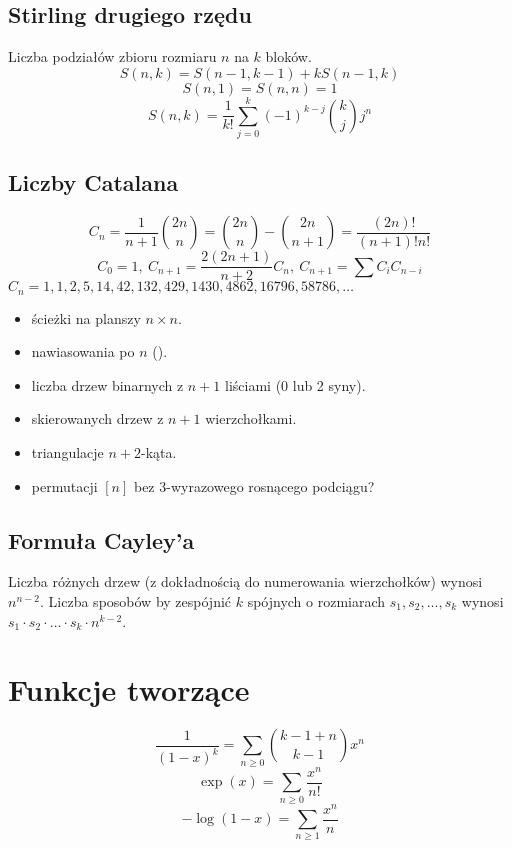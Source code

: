 	\subsection{Stirling drugiego rzędu}
		Liczba podziałów zbioru rozmiaru $n$ na $k$ bloków.
		$$S(n,k) = S(n-1,k-1) + k S(n-1,k)$$
		$$S(n,1) = S(n,n) = 1$$
		$$S(n,k) = \frac{1}{k!}\sum_{j=0}^k (-1)^{k-j}\binom{k}{j}j^n$$

	\subsection{Liczby Catalana}
		\[ C_n=\frac{1}{n+1}\binom{2n}{n}= \binom{2n}{n}-\binom{2n}{n+1} = \frac{(2n)!}{(n+1)!n!} \]
		\[ C_0=1,\ C_{n+1} = \frac{2(2n+1)}{n+2}C_n,\ C_{n+1}=\sum C_iC_{n-i} \]
		${C_n = 1, 1, 2, 5, 14, 42, 132, 429, 1430, 4862, 16796, 58786, \dots}$

		\begin{itemize}[noitemsep]
			\item ścieżki na planszy $n\times n$.
			\item nawiasowania po $n$ ().
			\item liczba drzew binarnych z $n+1$ liściami (0 lub 2 syny).
			\item skierowanych drzew z $n+1$ wierzchołkami.
			\item triangulacje $n+2$-kąta.
			\item permutacji $[n]$ bez 3-wyrazowego rosnącego podciągu?
		\end{itemize}

		\hfil

	\subsection{Formuła Cayley'a}
		Liczba różnych drzew (z dokładnością do numerowania wierzchołków) wynosi $n^{n-2}$.
		Liczba sposobów by zespójnić $k$ spójnych o rozmiarach $s_1, s_2, \dots, s_k$ wynosi $s_1 \cdot s_2 \cdot \dots \cdot s_k \cdot n^{k-2}$.

\section{Funkcje tworzące}
		$$ \dfrac{1}{\left(1-x\right)^k} = \sum_{n\geq 0} \binom{k - 1 + n}{k - 1} x ^ n $$
		$$ \exp(x) = \sum_{n\geq 0} \dfrac{x^n}{n!} $$
		$$ -\log(1 - x) = \sum_{n\geq 1} \dfrac{x^n}{n} $$


